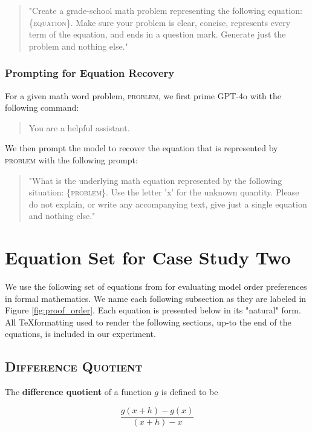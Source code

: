 \documentclass{article}
\begin{document}
\begin{quote}
    "Create a grade-school math problem representing the following equation: \{\textsc{equation}\}. Make sure your problem is clear, concise, represents every term of the equation, and ends in a question mark. Generate just the problem and nothing else."
\end{quote}

\subsubsection{Prompting for Equation Recovery}

For a given math word problem, \textsc{problem}, we first prime GPT-4o with the following command:

\begin{quote}
    You are a helpful assistant.
\end{quote}

We then prompt the model to recover the equation that is represented by \textsc{problem} with the following prompt:

\begin{quote}
    "What is the underlying math equation represented by the following situation: \{\textsc{problem}\}. Use the letter 'x' for the unknown quantity. Please do not explain, or write any accompanying text, give just a single equation and nothing else."
\end{quote}

\section{Equation Set for Case Study Two}\label{app:equations}

We use the following set of equations from \citet{mirin2022mathematicians} for evaluating model order preferences in formal mathematics. We name each following subsection as they are labeled in Figure \ref{fig:proof_order}. Each equation is presented below in its "natural" form. All \TeX formatting used to render the following sections, up-to the end of the equations, is included in our experiment.

\subsection{\textsc{Difference Quotient}}
The \textbf{difference quotient} of a function $g$ is defined to be 

\begin{equation*}
    \frac{g(x + h) - g(x)}{(x + h) - x}
\end{equation*}
\end{document}
